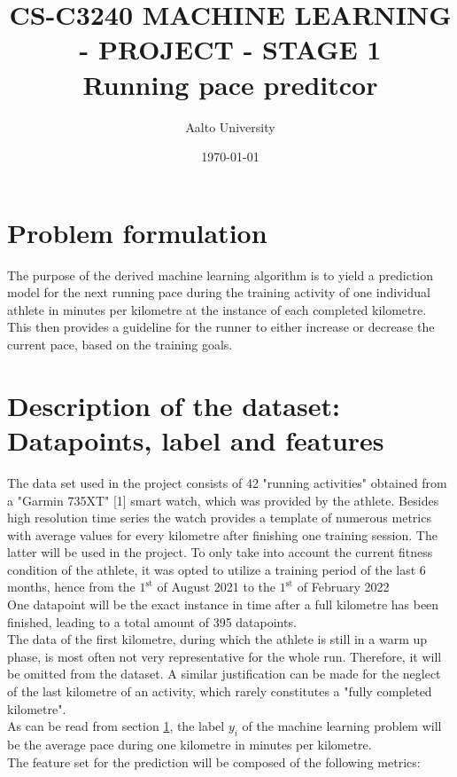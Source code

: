 \documentclass[11pt]{article}
\title{\Huge CS-C3240 MACHINE LEARNING - PROJECT - STAGE 1  \\Running pace preditcor}
\author{Aalto University}
\date{\today}
\begin{document}
\maketitle

\section{Problem formulation}
\label{section: 1}
The purpose of the derived machine learning algorithm is to yield a prediction model for the next running pace during the training activity of one individual athlete in minutes per kilometre at the instance of each completed kilometre. This then provides a guideline for the runner to either increase or decrease the current pace, based on the training goals.

\section{Description of the dataset: Datapoints, label and features}
The data set used in the project consists of 42 "running activities" obtained from a "Garmin 735XT" [1] smart watch, which was provided by the athlete.  Besides high resolution time series the watch provides a template of numerous metrics with average values for every kilometre after finishing one training session. The latter will be used in the project.
To only take into account the current fitness condition of the athlete, it was opted to utilize a training period of the last 6 months, hence from the $1^{\text{st}}$ of August 2021 to the $1^{\text{st}}$ of February 2022\\
One datapoint will be the exact instance in time after a full kilometre has been finished, leading to a total amount of 395 datapoints.\\
The data of the first kilometre, during which the athlete is still in a warm up phase, is most often not very representative for the whole run. Therefore, it will be omitted from the dataset. A similar justification can be made for the neglect of the last kilometre of an activity, which rarely constitutes a "fully completed kilometre".\\
As can be read from section \ref{section: 1}, the label ${y_i}$ of the machine learning problem will be the average pace during one kilometre in minutes per kilometre.\\
The feature set for the prediction will be composed of the following metrics:
\end{document}
